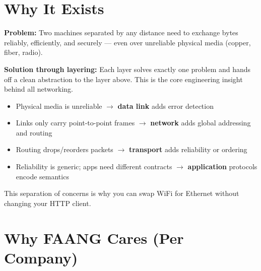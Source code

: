 \documentclass[11pt]{article}
\providecommand{\tightlist}{\setlength{\itemsep}{1pt}\setlength{\parskip}{0pt}}
\begin{document}
\section{Why It Exists}\label{why-it-exists}

\textbf{Problem:} Two machines separated by any distance need to exchange bytes reliably, efficiently, and securely --- even over unreliable physical media (copper, fiber, radio).

\textbf{Solution through layering:} Each layer solves exactly one problem and hands off a clean abstraction to the layer above. This is the core engineering insight behind all networking.

\begin{itemize}
\tightlist
\item
  Physical media is unreliable \(\rightarrow\) \textbf{data link} adds error detection
\item
  Links only carry point-to-point frames \(\rightarrow\) \textbf{network} adds global addressing and routing
\item
  Routing drops/reorders packets \(\rightarrow\) \textbf{transport} adds reliability or ordering
\item
  Reliability is generic; apps need different contracts \(\rightarrow\) \textbf{application} protocols encode semantics
\end{itemize}

This separation of concerns is why you can swap WiFi for Ethernet without changing your HTTP client.

\section{Why FAANG Cares (Per Company)}\label{why-faang-cares-per-company}
\end{document}
